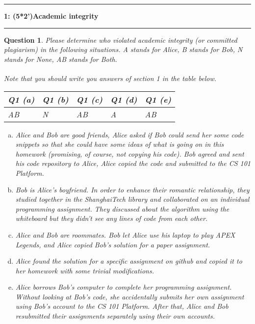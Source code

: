 \documentclass[10.5pt]{article}
\newcommand\question[2]{\vspace{.25in}\hrule\textbf{#1: #2}\vspace{.5em}
\hrule\vspace{.10in}}
\newtheorem{Q}{Question}
\begin{document}
  \question{1}{(5*2')Academic integrity}
    \begin{Q}
    Please determine who violated academic integrity (or committed plagiarism) in the following situations. A stands for Alice, B stands for Bob, N stands for None, AB stands for Both.
    \\ \\
    \textit{Note that you should write you answers of section 1 in the table below.}
\begin{table}[htbp]
	\begin{tabular}{|p{1.5cm}|p{1.5cm}|p{1.5cm}|p{1.5cm}|p{1.5cm}|}
		\hline 
		Q1 (a) & Q1 (b) & Q1 (c) & Q1 (d) & Q1 (e) \\ 
		\hline 
		 AB & N & AB & A & AB \\ 
		\hline 
	\end{tabular} 
\end{table}
    	\begin{enumerate}[(a)]
    		\item Alice and Bob are good friends, Alice asked if Bob could send her some code snippets so that she could have some ideas of what is going on in this homework (promising, of course, not copying his code). Bob agreed and sent his code repository to Alice, Alice copied the code and submitted to the CS 101 Platform.
    		
    		\item Bob is Alice's boyfriend. In order to enhance their romantic relationship, they studied together in the ShanghaiTech library and collaborated on an individual programming assignment. They discussed about the algorithm using the whiteboard but they didn't see any lines of code from each other.
    		    		
    		    		
    		\item Alice and Bob are roommates. Bob let Alice use his laptop to play APEX Legends, and Alice copied Bob's solution for a paper assignment.
    		
    		\item Alice found the solution for a specific assignment on github and copied it to her homework with some trivial modifications.
    		
    		\item Alice borrows Bob's computer to complete her programming assignment. Without looking at Bob's code, she accidentally submits her own assignment using Bob's account to the CS 101 Platform. After that, Alice and Bob resubmitted their assignments separately using their own accounts.
    		
    		\end{enumerate}
    \end{Q}
	
\end{document}
